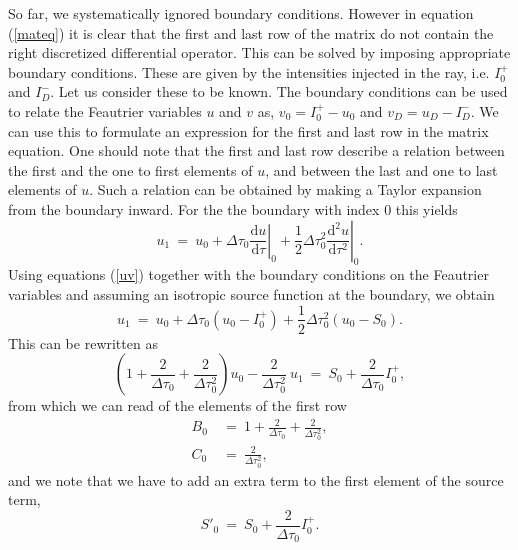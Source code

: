 \documentclass[]{article}
\newcommand{\D}{\text{d}}
\begin{document}
So far, we systematically ignored boundary conditions. However in equation (\ref{mateq}) it is clear that the first and last row of the matrix do not contain the right discretized differential operator. This can be solved by imposing appropriate boundary conditions. These are given by the intensities injected in the ray, i.e. $I_{0}^{+}$ and $I_{D}^{-}$. Let us consider these to be known. The boundary conditions can be used to relate the Feautrier variables $u$ and $v$ as, $v_{0} = I_{0}^{+} - u_{0}$ and $v_{D} = u_{D} -I_{D}^{-}$. We can use this to formulate an expression for the first and last row in the matrix equation.
One should note that the first and last row describe a relation between the first and the one to first elements of $u$, and between the last and one to last elements of $u$. Such a relation can be obtained by making a Taylor expansion from the boundary inward. For the the boundary with index 0 this yields
\begin{equation}
u_{1} \ = \ u_{0} + \Delta\tau_{0} \left.\frac{\D u}{\D \tau}\right|_{0} + \frac{1}{2} \Delta\tau_{0}^{2} \left.\frac{\D^{2} u}{\D \tau^{2}}\right|_{0} .
\end{equation}
Using equations (\ref{uv}) together with the boundary conditions on the Feautrier variables and assuming an isotropic source function at the boundary, we obtain
\begin{equation}
u_{1} \ = \ u_{0} + \Delta\tau_{0} \left(u_{0}-I_{0}^{+}\right) + \frac{1}{2} \Delta\tau_{0}^{2} \left( u_{0} - S_{0} \right) .
\end{equation}
This can be rewritten as
\begin{equation}
\left( 1 + \frac{2}{\Delta\tau_{0}} + \frac{2}{\Delta\tau_{0}^{2}} \right)u_{0} - \frac{2}{\Delta\tau_{0}^{2}} \ u_{1}
  \ = \  S_{0} + \frac{2}{\Delta\tau_{0}} I_{0}^{+},
\end{equation}
from which we can read of the elements of the first row
\begin{equation}
\begin{split}
B_{0} \ &= \ 1 + \frac{2}{\Delta\tau_{0}} + \frac{2}{\Delta\tau_{0}^{2}}, \\
C_{0} \ &= \ \frac{2}{\Delta\tau_{0}^{2}},
\end{split}
\end{equation}
and we note that we have to add an extra term to the first element of the source term,
\begin{equation}
S'_{0}  \ = \  S_{0} + \frac{2}{\Delta\tau_{0}} I_{0}^{+}.
\end{equation}
\end{document}
